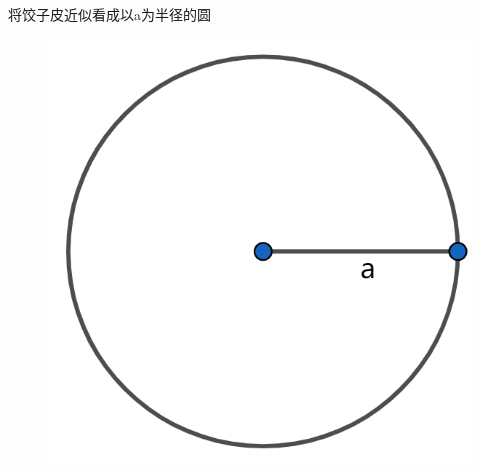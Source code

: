 \documentclass[lang=cn,a4paper]{elegantpaper}
\begin{document}
    将饺子皮近似看成以a为半径的圆
    \begin{figure}[H]
        \centering
        \includegraphics[scale=0.4]{circle.png}
    \end{figure}
\end{document}
